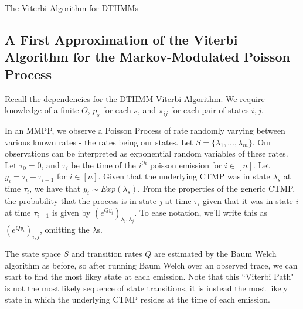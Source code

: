 \begin{algorithm}
\SetAlgoLined
{}

\caption{The Viterbi Algorithm for DTHMMs}\label{algvitdthmm}

\end{algorithm}

\subsection{A First Approximation of the Viterbi Algorithm for the Markov-Modulated Poisson Process}

Recall the dependencies for the DTHMM Viterbi Algorithm. We require knowledge of a finite $O$, $p_s$ for each $s$, and $\pi_{ij}$ for each pair of states $i,j$.

In an MMPP, we observe a Poisson Process of rate randomly varying between various known rates - the rates being our states. Let $S = \{\lambda_1,...,\lambda_m\}$. Our observations can be interpreted as exponential random variables of these rates. Let $\tau_0 = 0$, and $\tau_i$ be the time of the $i^{th}$ poisson emission for $i \in [n]$. Let $y_i = \tau_i-\tau_{i-1}$ for $i \in [n]$. Given that the underlying CTMP was in state $\lambda_s$ at time $\tau_i$, we have that $y_i \sim Exp (\lambda_s)$. From the properties of the generic CTMP, the probability that the process is in state $j$ at time $\tau_i$ given that it was in state $i$ at time $\tau_{i-1}$ is given by $(e^{Qy_i})_{\lambda_{i},\lambda_{j}}$. To ease notation, we'll write this as $(e^{Qy_i})_{i,j}$, omitting the $\lambda$s.

The state space $S$ and transition rates $Q$ are estimated by the Baum Welch algorithm as before, so after running Baum Welch over an observed trace, we can start to find the most likey state at each emission. Note that this ``Viterbi Path" is not the most likely sequence of state transitions, it is instead the most likely state in which the underlying CTMP resides at the time of each emission. 

